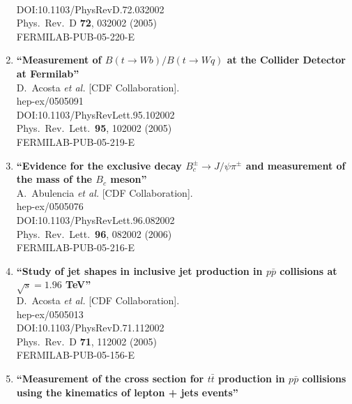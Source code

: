 \documentclass{article}
\begin{document}
\begin{enumerate}
  \\{}DOI:10.1103/PhysRevD.72.032002
  \\{}Phys.\ Rev.\ D {\bf 72}, 032002 (2005)
  \\{}FERMILAB-PUB-05-220-E
\item%
{\bf ``Measurement of $B(t \to W b)/B(t \to W q)$ at the Collider Detector at Fermilab''}
  \\{}D.~Acosta {\it et al.} [CDF Collaboration].
  \\{}hep-ex/0505091
  \\{}DOI:10.1103/PhysRevLett.95.102002
  \\{}Phys.\ Rev.\ Lett.\  {\bf 95}, 102002 (2005)
  \\{}FERMILAB-PUB-05-219-E
\item%
{\bf ``Evidence for the exclusive decay $B_c^\pm \to J/\psi \pi^\pm$ and measurement of the mass of the $B_c$ meson''}
  \\{}A.~Abulencia {\it et al.} [CDF Collaboration].
  \\{}hep-ex/0505076
  \\{}DOI:10.1103/PhysRevLett.96.082002
  \\{}Phys.\ Rev.\ Lett.\  {\bf 96}, 082002 (2006)
  \\{}FERMILAB-PUB-05-216-E
\item%
{\bf ``Study of jet shapes in inclusive jet production in $p\bar{p}$ collisions at $\sqrt{s}=1.96$ TeV''}
  \\{}D.~Acosta {\it et al.} [CDF Collaboration].
  \\{}hep-ex/0505013
  \\{}DOI:10.1103/PhysRevD.71.112002
  \\{}Phys.\ Rev.\ D {\bf 71}, 112002 (2005)
  \\{}FERMILAB-PUB-05-156-E
\item%
{\bf ``Measurement of the cross section for $t\bar{t}$ production in $p\bar{p}$ collisions using the kinematics of lepton + jets events''}

\end{enumerate}
\end{document}
